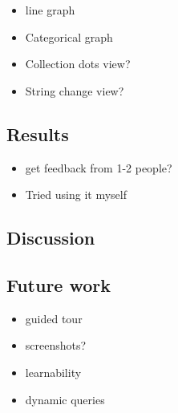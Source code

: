 \documentclass{sigchi}
\providecommand{\tightlist}{%
  \setlength{\itemsep}{0pt}\setlength{\parskip}{0pt}}
\begin{document}
\begin{itemize}
\tightlist
\item
  line graph
\item
  Categorical graph
\item
  Collection dots view?
\item
  String change view?
\end{itemize}

\hypertarget{results}{%
\subsection{Results}\label{results}}

\begin{itemize}
\tightlist
\item
  get feedback from 1-2 people?
\item
  Tried using it myself
\end{itemize}

\hypertarget{discussion}{%
\subsection{Discussion}\label{discussion}}

\hypertarget{future-work}{%
\subsection{Future work}\label{future-work}}

\begin{itemize}
\tightlist
\item
  guided tour
\item
  screenshots?
\item
  learnability
\item
  dynamic queries
\end{itemize}

%
%
%
%
%
\balance{}

% 
% 

\printbibliography
\end{document}
